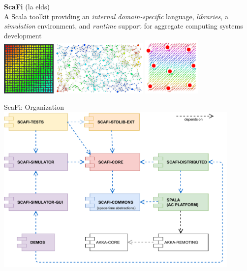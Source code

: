 \documentclass[presentation, 9pt]{beamer}\mode<presentation>{\usetheme{AMSBolognaFC}}
\begin{document}
\begin{frame}[c, plain]
\begin{center}
	{\Huge \textbf{ScaFi} (la elds)}\\
	{\large A Scala toolkit providing an \emph{internal domain-specific} language, \emph{libraries}, a \emph{simulation} environment, and \emph{runtime} support for  aggregate computing systems development} \\[0.3cm]
	\includegraphics[width=0.2\textwidth]{img/gradient-scafi.png}
	\includegraphics[width=0.35\textwidth]{img/scr-result.png}
	\includegraphics[width=0.215\textwidth]{img/obstacle-avoidance.png}
\end{center}
\end{frame}
\begin{frame}{ScaFi: Organization}
\centering
\includegraphics[width=0.9\textwidth]{img/scafi-project-org.pdf}
\end{frame}
\end{document}
